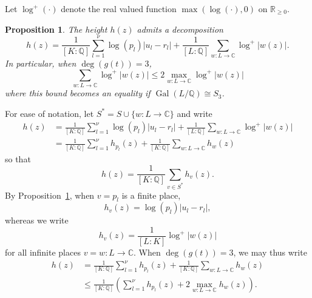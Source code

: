 \documentclass[11pt]{report}
\newtheorem{proposition}[theorem]{Proposition}
\theoremstyle{definition}
\DeclareMathOperator{\Gal}{Gal}
\begin{document}
Let $\log^+(\cdot)$ denote the real valued function $\max(\log(\cdot), 0)$ on $\mathbb{R}_{\geq 0}$.

\begin{proposition}\label{prop:heightdecomp}
The height $h(z)$ admits a decomposition
\begin{equation} \label{eq:hdecomp}
h(z) = \frac{1}{[K:\mathbb{Q}]}\sum_{l = 1}^{\nu} \log(p_l)|u_l - r_l| + \frac{1}{[L:\mathbb{Q}]}\sum_{w :L \to \mathbb{C}} \log^+|w(z)|.
\end{equation}
In particular, when $\deg(g(t)) = 3$,
\[\sum_{w :L \to \mathbb{C}} \log^+|w(z)| \leq 2\max_{w:L\to \mathbb{C}} \log^+|w(z)|\] where this bound becomes an equality if $ \Gal(L/\mathbb{Q}) \cong S_3$.
\end{proposition}
For ease of notation, let $S^* = S \cup \{w : L \to \mathbb{C}\}$ and write
\begin{align*}
  h(z) & = \frac{1}{[K:\mathbb{Q}]}\sum_{l = 1}^{\nu} \log(p_l)|u_l - r_l| +
         \frac{1}{[L:\mathbb{Q}]}\sum_{w :L \to \mathbb{C}} \log^+|w(z)| \\
       & = \frac{1}{[K:\mathbb{Q}]}\sum_{l = 1}^{\nu} h_{p_l}(z) +
         \frac{1}{[K:\mathbb{Q}]}\sum_{w :L \to \mathbb{C}} h_w(z)
\end{align*}
so that
\[h(z) = \frac{1}{[K:\mathbb{Q}]}\sum_{v \in S^*}h_{v}(z).\]
By Proposition~\ref{prop:heightdecomp}, when $v = p_l$ is a finite place,
\[h_{v}(z) = \log(p_l)|u_l - r_l|,\]
whereas we write
\[h_{v}(z) = \frac{1}{[L:K]} \log^+|w(z)|\]
for all infinite places $v = w:L \to \mathbb{C}$. When $\deg(g(t)) = 3$, we may thus write
\begin{align*}
  h(z) & = \frac{1}{[K:\mathbb{Q}]}\sum_{l = 1}^{\nu} h_{p_l}(z) +
         \frac{1}{[K:\mathbb{Q}]}\sum_{w :L \to \mathbb{C}} h_w(z)\\
       & \leq \frac{1}{[K:\mathbb{Q}]}\left(\sum_{l = 1}^{\nu} h_{p_l}(z) +
         2\max_{w :L \to \mathbb{C}} h_w(z)\right).
\end{align*}
\end{document}

